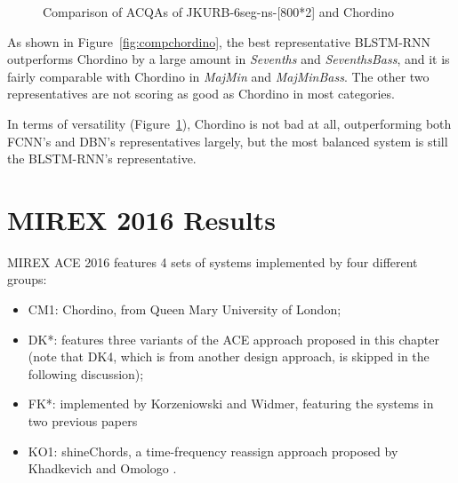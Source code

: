 \begin{figure}[htb]
	\centering
	\caption{Comparison of ACQAs of JKURB-6seg-ns-[800*2] and Chordino}
	\label{fig:acqachordino}
\end{figure}

As shown in Figure~\ref{fig:compchordino}, the best representative BLSTM-RNN outperforms Chordino by a large amount in \textit{Sevenths} and \textit{SeventhsBass}, and it is fairly comparable with Chordino in \textit{MajMin} and \textit{MajMinBass}. The other two representatives are not scoring as good as Chordino in most categories.

In terms of versatility (Figure~\ref{fig:acqachordino}), Chordino is not bad at all, outperforming both FCNN's and DBN's representatives largely, but the most balanced system is still the BLSTM-RNN's representative.

\section{MIREX 2016 Results}
MIREX ACE 2016 features 4 sets of systems implemented by four different groups:
\begin{itemize}
\item CM1: Chordino, from Queen Mary University of London;
\item DK*: features three variants of the ACE approach proposed in this chapter (note that DK4, which is from another design approach, is skipped in the following discussion);
\item FK*: implemented by Korzeniowski and Widmer, featuring the systems in two previous papers \cite{Korzeniowski2016feature,Korzeniowski2016convolutional}
\item KO1: shineChords, a time-frequency reassign approach proposed by Khadkevich and Omologo \cite{khadkevich2011time}.
\end{itemize}

